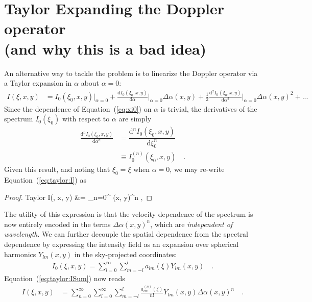 \section{Taylor Expanding the Doppler operator \\ (and why this is a bad idea)}
\label{sec:taylor}
%
An alternative way to tackle the problem is to linearize the Doppler 
operator via a Taylor expansion in $\alpha$ about $\alpha=0$:
%
\begin{align}
    \label{eq:taylor:I}
    I(\xi, x, y) 
        &=
        I_0(\xi_0, x, y) \Bigg|_{\alpha=0}
        + 
        \frac{\mathrm{d}I_0(\xi_0, x, y)}{\mathrm{d}\alpha} \Bigg|_{\alpha=0} 
            \Delta\alpha(x, y)
        + 
        \frac{1}{2}\frac{\mathrm{d}^2I_0(\xi_0, x, y)}{\mathrm{d}\alpha^2} 
            \Bigg|_{\alpha=0} \Delta\alpha(x, y)^2
        +
        ... 
\end{align}
%
Since the dependence of Equation~(\ref{eq:xi0}) on $\alpha$ is trivial,
the derivatives of the spectrum $I_0(\xi_0)$ with respect to
$\alpha$ are simply
%
\begin{align}
    \frac{\mathrm{d}^nI_0(\xi_0, x, y)}{\mathrm{d}\alpha^n} &=
    \dfrac{\mathrm{d}^nI_0(\xi_0, x, y)}{\mathrm{d}\xi_0^n} \nonumber\\ &\equiv
    I_0^{(n)}(\xi_0, x, y)
    \quad.
\end{align}
%
Given this result, and noting that $\xi_0 = \xi$ when $\alpha = 0$,
we may re-write Equation~(\ref{eq:taylor:I}) as
%
\begin{proof}{Taylor}
    \label{eq:taylor:ISum}
    I(\xi, x, y) 
        &=
        \sum_{n=0}^\infty
            \Delta\alpha(x, y)^n
        \quad ,
\end{proof}
%
The utility of this expression is that the velocity dependence of the spectrum
is now entirely encoded in the terms $\Delta\alpha(x, y)^n$, which are
\emph{independent of wavelength}. We can further decouple the spatial
dependence from the spectral dependence by expressing the intensity field
as an expansion over spherical harmonics $Y_{lm}(x, y)$ in the sky-projected
coordinates:
%
\begin{align}
    I_0(\xi, x, y) = \sum_{l=0}^\infty\sum_{m=-l}^{l} a_{lm}(\xi) Y_{lm}(x, y)
    \quad .
\end{align}
%
Equation~(\ref{eq:taylor:ISum}) now reads
%
\begin{align}
    \label{eq:taylor:IYlm}
    I(\xi, x, y) 
        &=
        \sum_{n=0}^\infty
            \sum_{l=0}^\infty\sum_{m=-l}^{l}
                \frac{a_{lm}^{(n)}(\xi)}{n!}
                Y_{lm}(x, y)\Delta\alpha(x, y)^n
            \quad .
\end{align}
